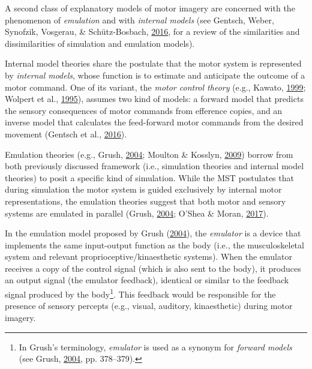 \documentclass[a4paper,12pt,twoside,openright,oldfontcommands]{memoir}
\let\rmarkdownfootnote\footnote%
\def\footnote{\protect\rmarkdownfootnote}
\begin{document}
A second class of explanatory models of motor imagery are concerned with the phenomenon of \emph{emulation} and with \emph{internal models} (see Gentsch, Weber, Synofzik, Vosgerau, \& Schütz-Bosbach, \protect\hyperlink{ref-gentsch_towards_2016}{2016}, for a review of the similarities and dissimilarities of simulation and emulation models).

Internal model theories share the postulate that the motor system is represented by \emph{internal models}, whose function is to estimate and anticipate the outcome of a motor command. One of its variant, the \emph{motor control theory} (e.g., Kawato, \protect\hyperlink{ref-kawato_internal_1999}{1999}; Wolpert et al., \protect\hyperlink{ref-wolpert_internal_1995}{1995}), assumes two kind of models: a forward model that predicts the sensory consequences of motor commands from efference copies, and an inverse model that calculates the feed-forward motor commands from the desired movement (Gentsch et al., \protect\hyperlink{ref-gentsch_towards_2016}{2016}).

Emulation theories (e.g., Grush, \protect\hyperlink{ref-grush_emulation_2004}{2004}; Moulton \& Kosslyn, \protect\hyperlink{ref-moulton_imagining_2009}{2009}) borrow from both previously discussed framework (i.e., simulation theories and internal model theories) to posit a specific kind of simulation. While the MST postulates that during simulation the motor system is guided exclusively by internal motor representations, the emulation theories suggest that both motor and sensory systems are emulated in parallel (Grush, \protect\hyperlink{ref-grush_emulation_2004}{2004}; O'Shea \& Moran, \protect\hyperlink{ref-oshea_does_2017}{2017}).

In the emulation model proposed by Grush (\protect\hyperlink{ref-grush_emulation_2004}{2004}), the \emph{emulator} is a device that implements the same input-output function as the body (i.e., the musculoskeletal system and relevant proprioceptive/kinaesthetic systems). When the emulator receives a copy of the control signal (which is also sent to the body), it produces an output signal (the emulator feedback), identical or similar to the feedback signal produced by the body\footnote{In Grush's terminology, \emph{emulator} is used as a synonym for \emph{forward models} (see Grush, \protect\hyperlink{ref-grush_emulation_2004}{2004}, pp. 378--379).}. This feedback would be responsible for the presence of sensory percepts (e.g., visual, auditory, kinaesthetic) during motor imagery.
\end{document}
